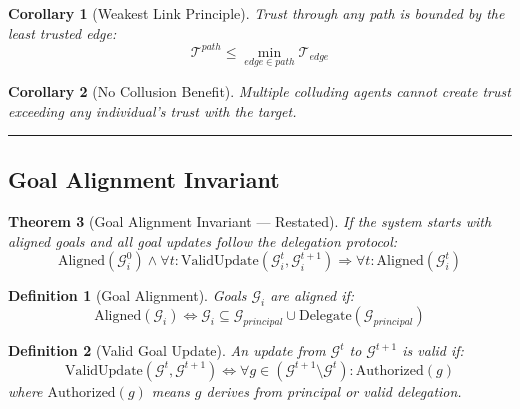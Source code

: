 \documentclass[
]{article}
\newtheorem{definition}{Definition}[section]
\newtheorem{theorem}{Theorem}[section]
\newtheorem{corollary}[theorem]{Corollary}
\begin{document}
\begin{corollary}[Weakest Link Principle]
\label{cor:weakest-link}
Trust through any path is bounded by the least trusted edge:
\begin{equation}
\label{eq:weakest-link}
\mathcal{T}^{path} \leq \min_{edge \in path} \mathcal{T}_{edge}
\end{equation}
\end{corollary}

\begin{corollary}[No Collusion Benefit]
\label{cor:no-collusion}
Multiple colluding agents cannot create trust exceeding any individual's trust with the target.
\end{corollary}

\begin{center}\rule{0.5\linewidth}{0.5pt}\end{center}

\subsection{Goal Alignment Invariant}\label{sec:thm58-proof}

\begin{theorem}[Goal Alignment Invariant --- Restated]
\label{thm:goal-alignment-restated}
If the system starts with aligned goals and all goal updates follow the delegation protocol:
\begin{equation}
\label{eq:goal-alignment-restated}
\text{Aligned}(\mathcal{G}_i^0) \land \forall t: \text{ValidUpdate}(\mathcal{G}_i^t, \mathcal{G}_i^{t+1}) \Rightarrow \forall t: \text{Aligned}(\mathcal{G}_i^t)
\end{equation}
\end{theorem}

\begin{definition}[Goal Alignment]
\label{def:goal-alignment}
Goals $\mathcal{G}_i$ are aligned if:
\begin{equation}
\label{eq:goal-alignment-def}
\text{Aligned}(\mathcal{G}_i) \iff \mathcal{G}_i \subseteq \mathcal{G}_{principal} \cup \text{Delegate}(\mathcal{G}_{principal})
\end{equation}
\end{definition}

\begin{definition}[Valid Goal Update]
\label{def:valid-update}
An update from $\mathcal{G}^t$ to $\mathcal{G}^{t+1}$ is valid if:
\begin{equation}
\label{eq:valid-update}
\text{ValidUpdate}(\mathcal{G}^t, \mathcal{G}^{t+1}) \iff \forall g \in (\mathcal{G}^{t+1} \setminus \mathcal{G}^t): \text{Authorized}(g)
\end{equation}
where $\text{Authorized}(g)$ means $g$ derives from principal or valid delegation.
\end{definition}
\end{document}
